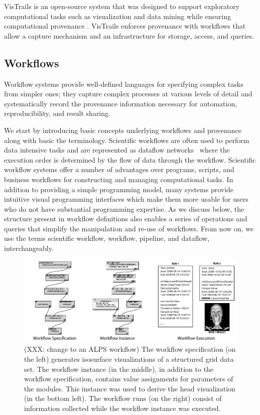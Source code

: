 \documentclass[12pt]{iopart}
\begin{document}
VisTrails is an open-source system that was designed to support
exploratory computational tasks such as visualization and data mining
while ensuring computational provenance \cite{vistrails,Bavoil05}.
VisTrails enforces provenance with workflows that allow a capture
mechanism and an infrastructure for storage, access, and queries.

\subsection{ Workflows}

Workflow systems provide well-defined languages for specifying complex
tasks from simpler ones; they capture complex processes at various
levels of detail and systematically record the provenance information
necessary for automation, reproducibility, and result sharing.

We start by introducing basic concepts underlying
workflows and provenance along with basic the terminology.
Scientific workflows are often used to perform data intensive tasks
and are represented as dataflow networks~\cite{lee@ieee1995} where the
execution order is determined by the flow of data through the
workflow. Scientific workflow systems offer a number of advantages
over programs, scripts, and business workflows for constructing and
managing computational tasks. In addition to providing a simple
programming model, many systems provide intuitive visual programming
interfaces which make them more usable for users who do not have
substantial programming expertise. As we discuss below, the structure
present in workflow definitions also enables a series of operations
and queries that simplify the manipulation and re-use of workflows.
From now on, we use the terms scientific workflow, workflow, pipeline,
and dataflow, interchangeably.

\begin{figure}[t]
\includegraphics[width=\linewidth]{figures/provenance_types.pdf}
\caption{(XXX: change to an ALPS workflow) The workflow specification (on the left)
  generates isosurface visualizations of a structured grid data
  set. The workflow instance (in the middle), in addition to the
  workflow specification, contains value assignments for parameters of
  the modules. This instance was used to derive the head visualization
  (in the bottom left). The workflow runs (on the right) consist of
  information collected while the workflow instance was executed.  
}
\vspace{0cm}
\label{fig:workflow-spec-run}
\end{figure}
\end{document}
